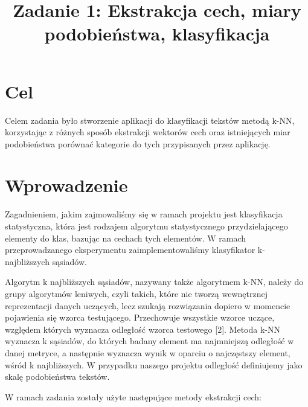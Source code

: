 \documentclass{classrep}
\author{
\studentinfo{Justyna Hubert}{210200} \and
\studentinfo{Karol Podlewski}{210294}
}
\title{Zadanie 1: Ekstrakcja cech, miary podobieństwa, klasyfikacja}
\begin{document}
\maketitle

\section{Cel}
Celem zadania było stworzenie aplikacji do klasyfikacji tekstów metodą k-NN, korzystając z różnych sposób ekstrakcji wektorów cech oraz istniejących miar podobieństwa porównać kategorie do tych przypisanych przez aplikację.

\section{Wprowadzenie}	
Zagadnieniem, jakim zajmowaliśmy się w ramach projektu jest klasyfikacja statystyczna, która jest rodzajem algorytmu statystycznego przydzielającego elementy do klas, bazując na cechach tych elementów. W ramach przeprowadzanego eksperymentu zaimplementowaliśmy klasyfikator k-najbliższych sąsiadów. \newline

Algorytm k najbliższych sąsiadów, nazywany także algorytmem k-NN, należy do grupy algorytmów leniwych, czyli takich, które nie tworzą wewnętrznej reprezentacji danych uczących, lecz szukają rozwiązania dopiero w momencie pojawienia się wzorca testującego. Przechowuje wszystkie wzorce uczące, względem których wyznacza odległość wzorca testowego [2]. Metoda k-NN wyznacza k sąsiadów, do których badany element ma najmniejszą odległość w danej metryce, a następnie wyznacza wynik w oparciu o najczęstszy element, wśród k najbliższych. W przypadku naszego projektu odległość definiujemy jako skalę podobieństwa tekstów. \newline

W ramach zadania zostały użyte następujące metody ekstrakcji cech: \newline
\end{document}

